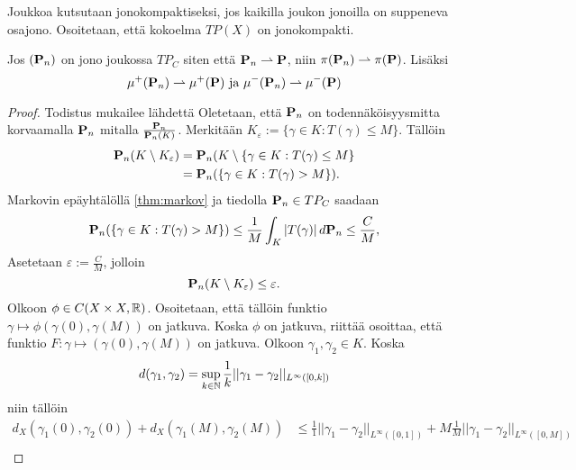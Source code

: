\documentclass[12pt,oneside,a4paper]{amsbook} %
\begin{document}
Joukkoa kutsutaan jonokompaktiseksi, jos kaikilla joukon jonoilla on suppeneva osajono. Osoitetaan, että
kokoelma $TP(X)$ on jonokompakti.

\begin{theorem}\label{le:tfPlanWeakConv}
    Jos $(\P_n)$ on jono joukossa $TP_C$ siten että $\P_n \rightharpoonup \P$, niin $\pi(\P_n) \rightharpoonup \pi(\P)$. Lisäksi 
    \begin{equation*}
    \mu^+(\P_n) \rightharpoonup \mu^+(\P) \text{ ja }  \mu^-(\P_n) \rightharpoonup \mu^-(\P) 
    \end{equation*}
    
\end{theorem}
\begin{proof}
    Todistus mukailee lähdettä \cite[s. 33]{optimal} Oletetaan, että $\P_n$ on todennäköisyysmitta korvaamalla $\P_n$ mitalla $\frac{\P_n}{\P_n(K)}$. Merkitään $K_\varepsilon := \{\gamma \in K : T(\gamma) \le M\}$. Tällöin
    \begin{align*}
        \P_n(K\setminus K_\varepsilon) &= \P_n(K\setminus\{\gamma \in K: T(\gamma) \le M\} \\
        &= \P_n(\{\gamma \in K : T(\gamma) > M\}).
    \end{align*}
    Markovin epäyhtälöllä \ref{thm:markov} ja tiedolla $\P_n \in TP_C$ saadaan 
    \begin{equation*}
        \P_n(\{\gamma \in K : T(\gamma) > M\}) \le \frac{1}{M}\int_K |T(\gamma)| \, d\P_n \le \frac{C}{M},
    \end{equation*}
    Asetetaan $\varepsilon := \frac{C}{M}$, jolloin
    \begin{equation*}
        \P_n(K\setminus K_\varepsilon) \le \varepsilon.
    \end{equation*}
    Olkoon $\phi \in C(X\times X, \R)$. Osoitetaan, että tällöin funktio $\gamma \mapsto \phi(\gamma(0), \gamma(M))$ on jatkuva. Koska $\phi$ on jatkuva, riittää osoittaa, että funktio $F: \gamma \mapsto (\gamma(0), \gamma(M))$ on jatkuva. Olkoon $\gamma_1, \gamma_2 \in K$. Koska
    \begin{equation*}
        d(\gamma_1, \gamma_2) = \sup_{k\in\N} \frac{1}{k}||\gamma_1-\gamma_2||_{L^\infty([0,k])}
    \end{equation*}
    niin tällöin
    \begin{align*}
        d_X(\gamma_1(0), \gamma_2(0)) + d_X(\gamma_1(M), \gamma_2(M)) &\le \frac{1}{1}||\gamma_1-\gamma_2||_{L^\infty([0,1])} + M\frac{1}{M}||\gamma_1-\gamma_2||_{L^\infty([0,M])} \\

\end{align*}
\end{proof}
\end{document}
